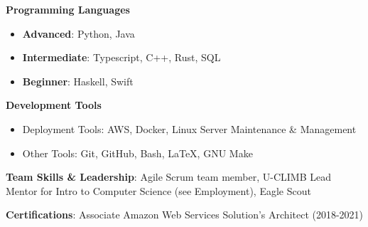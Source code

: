 \vspace{-2.0mm}


\begin{cventries}
\vspace{-5mm}
  \cventry
    {}
    {}
    {}
    {}
    {
      \begin{cvitems}
        \item {\textbf{Programming Languages}}
        \begin{itemize}
        \item \textbf{Advanced}: Python, Java
        \item \textbf{Intermediate}: Typescript, C++, Rust, SQL
        \item \textbf{Beginner}: Haskell, Swift
        \end{itemize}
        \item {\textbf{Development Tools}}
        \begin{itemize}
        \item {Deployment Tools: AWS, Docker, Linux Server Maintenance \& Management}
        \item {Other Tools: Git, GitHub, Bash, \LaTeX, GNU Make}
        \end {itemize}
        \item {\textbf{Team Skills \& Leadership}: Agile Scrum team
            member, U-CLIMB Lead Mentor for Intro to Computer Science (see Employment),
    Eagle Scout}
          \item {\textbf{Certifications}: Associate Amazon Web Services Solution's Architect (2018-2021)}
      \end{cvitems}
    }
    {}
\end{cventries}
